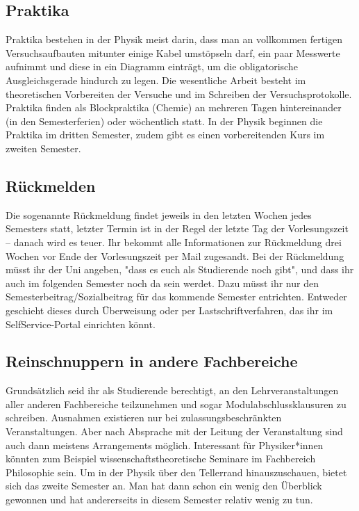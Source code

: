 \begin{multicols}{2}
\subsection{Praktika}
Praktika bestehen in der Physik meist darin, dass man an vollkommen fertigen Versuchsaufbauten mitunter einige Kabel umstöpseln darf, ein paar Messwerte aufnimmt und diese in ein Diagramm einträgt, um die obligatorische Ausgleichsgerade hindurch zu legen.
Die wesentliche Arbeit besteht im theoretischen Vorbereiten der Versuche und im Schreiben der Versuchsprotokolle.
Praktika finden als Blockpraktika (Chemie) an mehreren Tagen hintereinander (in den Semesterferien) oder wöchentlich statt.
In der Physik beginnen die Praktika im dritten Semester, zudem gibt es einen vorbereitenden Kurs im zweiten Semester.

\subsection{Rückmelden}
Die sogenannte Rückmeldung findet jeweils in den letzten Wochen jedes Semesters statt, letzter Termin ist in der Regel der letzte Tag der Vorlesungszeit -- danach wird es teuer.
Ihr bekommt alle Informationen zur Rückmeldung drei Wochen vor Ende der Vorlesungszeit per Mail zugesandt.
Bei der Rückmeldung müsst ihr der Uni angeben, "dass es euch als Studierende noch gibt", und dass ihr auch im folgenden Semester noch da sein werdet.
Dazu müsst ihr nur den Semesterbeitrag/Sozialbeitrag für das kommende Semester entrichten.
Entweder geschieht dieses durch Überweisung oder per Lastschriftverfahren, das ihr im SelfService-Portal einrichten könnt.

\subsection{Reinschnuppern in andere Fachbereiche}
Grundsätzlich seid ihr als Studierende berechtigt, an den Lehrveranstaltungen aller anderen Fachbereiche teilzunehmen und sogar Modulabschlussklausuren zu schreiben.
Ausnahmen existieren nur bei zulassungsbeschränkten Veranstaltungen.
Aber nach Absprache mit der Leitung der Veranstaltung sind auch dann meistens Arrangements möglich.
Interessant für Physiker*innen könnten zum Beispiel wissenschaftstheoretische Seminare im Fachbereich Philosophie sein.
Um in der Physik über den Tellerrand hinauszuschauen, bietet sich das zweite Semester an.
Man hat dann schon ein wenig den Überblick gewonnen und hat andererseits in diesem Semester relativ wenig zu tun.

\end{multicols}
